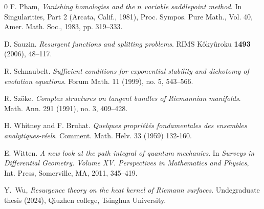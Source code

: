 \documentclass[11pt]{amsart}
\theoremstyle{plain}
\theoremstyle{definition}
\begin{document}
\begin{thebibliography}{0}
F. Pham,
\textit{Vanishing homologies and the $n$ variable saddlepoint method}. 
In Singularities, Part 2 (Arcata, Calif., 1981), Proc. Sympos. Pure Math., Vol. 40, Amer. Math. Soc., 1983, pp. 319--333.


D. Sauzin.
\textit{Resurgent functions and splitting problems}.
RIMS K\^oky\^uroku \textbf{1493} (2006), 48--117.


R. Schnaubelt.
\textit{Sufficient conditions for exponential stability and dichotomy of evolution equations}.
Forum Math. 11 (1999), no. 5, 543--566.




 R. Sz\"oke.
\textit{Complex structures on tangent bundles of Riemannian manifolds}.
Math. Ann. 291 (1991), no. 3, 409--428.


 H. Whitney and F. Bruhat.
\textit{Quelques propri\'et\'es fondamentales des ensembles analytiques-r\'eels}.
Comment. Math. Helv. 33 (1959) 132-160.


E. Witten.
\textit{A new look at the path integral of quantum mechanics}.
In \textit{Surveys in Differential Geometry. Volume XV. Perspectives in Mathematics and Physics}, Int. Press, Somerville, MA, 2011, 345--419.



Y.~Wu, \textit{Resurgence theory on the heat
kernel of Riemann surfaces}. Undegraduate thesis (2024), Qiuzhen college, Tsinghua University. 

\end{thebibliography}
\end{document}
